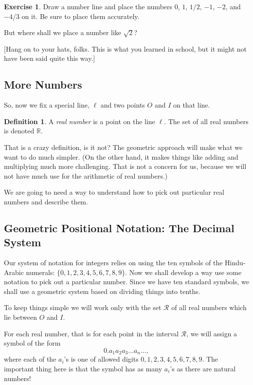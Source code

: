\documentclass[12pt,letterpaper]{article}
\theoremstyle{definition}
\newtheorem{exercise}[question]{Exercise}
\newtheorem*{definition}{Definition}
\begin{document}
\begin{exercise}
Draw a number line and place the numbers $0$, $1$, $1/2$, $-1$, $-2$, and $-4/3$ on it.
Be sure to place them accurately.
\end{exercise}

But where shall we place a number like $\sqrt{2}$?

[Hang on to your hats, folks.
This is what you learned in school, but it might not have been said quite this way.]

\subsection*{More Numbers}

So, now we fix a special line, $\ell$ and two points $O$ and $I$ on that line.

\begin{definition}
A \emph{real number} is a point on the line $\ell$.
The set of all real numbers is denoted $\mathbb{R}$.
\end{definition}

That is a crazy definition, is it not?
The geometric approach will make what we want to do much simpler.
(On the other hand, it makes things like adding and multiplying much more challenging. 
That is not a concern for us, because we will not have much use for the arithmetic of real numbers.)

We are going to need a way to understand how to pick out particular real numbers and describe them.

\subsection*{Geometric Positional Notation: The Decimal System}

Our system of notation for integers relies on using the ten symbols of the Hindu-Arabic numerals: $\{0, 1, 2, 3, 4, 5, 6, 7, 8, 9\}$.
Now we shall develop a way use some notation to pick out a particular number.
Since we have ten standard symbols, we shall use a geometric system based on dividing things into tenths.

To keep things simple we will work only with the set $\mathcal{R}$ of all real numbers which lie between $O$ and $I$.

For each real number, that is for each point in the interval $\mathcal{R}$, we will assign a symbol of the form 
\[
0.a_1a_2a_3\ldots a_n\ldots,
\]
where each of the $a_i$'s is one of allowed digits $0, 1, 2, 3, 4, 5, 6, 7, 8, 9$.
The important thing here is that the symbol has as many $a_i$'s as there are natural numbers!
\end{document}

